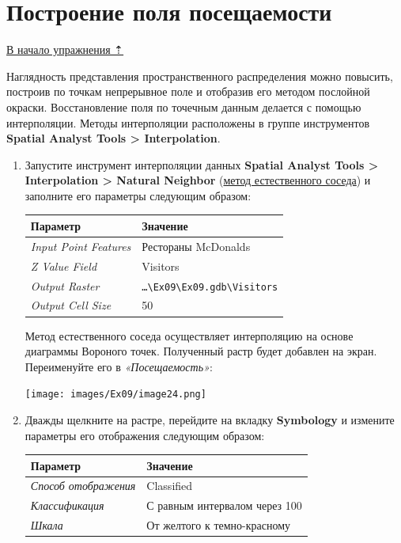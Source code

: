 \documentclass[12pt,]{book}
\begin{document}
\hypertarget{geocoding-field}{%
\section{Построение поля посещаемости}\label{geocoding-field}}

\protect\hyperlink{geocoding}{В начало упражнения ⇡}

Наглядность представления пространственного распределения можно повысить, построив по точкам непрерывное поле и отобразив его методом послойной окраски. Восстановление поля по точечным данным делается с помощью интерполяции. Методы интерполяции расположены в группе инструментов \textbf{Spatial Analyst Tools \textgreater{} Interpolation}.

\begin{enumerate}
\def\labelenumi{\arabic{enumi}.}
\item
  Запустите инструмент интерполяции данных \textbf{Spatial Analyst Tools \textgreater{} Interpolation \textgreater{} Natural Neighbor} (\href{http://desktop.arcgis.com/ru/arcmap/10.3/tools/spatial-analyst-toolbox/natural-neighbor.htm}{метод естественного соседа}) и заполните его параметры следующим образом:

  \begin{longtable}[]{@{}ll@{}}
  \toprule
  Параметр & Значение\tabularnewline
  \midrule
  \endhead
  \emph{Input Point Features} & Рестораны McDonalds\tabularnewline
  \emph{Z Value Field} & Visitors\tabularnewline
  \emph{Output Raster} & \texttt{\ldots{}\textbackslash{}Ex09\textbackslash{}Ex09.gdb\textbackslash{}Visitors}\tabularnewline
  \emph{Output Cell Size} & 50\tabularnewline
  \bottomrule
  \end{longtable}

  Метод естественного соседа осуществляет интерполяцию на основе диаграммы Вороного точек. Полученный растр будет добавлен на экран. Переименуйте его в \emph{«Посещаемость»}:

  \texttt{[image: images/Ex09/image24.png]}
\item
  Дважды щелкните на растре, перейдите на вкладку \textbf{Symbology} и измените параметры его отображения следующим образом:

  \begin{longtable}[]{@{}ll@{}}
  \toprule
  Параметр & Значение\tabularnewline
  \midrule
  \endhead
  \emph{Способ отображения} & Classified\tabularnewline
  \emph{Классификация} & С равным интервалом через 100\tabularnewline
  \emph{Шкала} & От желтого к темно-красному\tabularnewline
  \bottomrule
  \end{longtable}


\end{enumerate}
\end{document}

